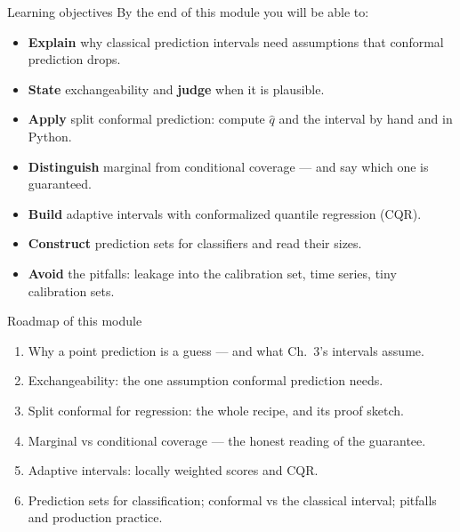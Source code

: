 \documentclass[aspectratio=169,11pt]{beamer}
\begin{document}
\begin{frame}{Learning objectives}
  By the end of this module you will be able to:
  \begin{itemize}
    \item \textbf{Explain} why classical prediction intervals need assumptions that
          conformal prediction drops.
    \item \textbf{State} exchangeability and \textbf{judge} when it is plausible.
    \item \textbf{Apply} split conformal prediction: compute $\hat q$ and the interval
          by hand and in Python.
    \item \textbf{Distinguish} marginal from conditional coverage --- and say which one
          is guaranteed.
    \item \textbf{Build} adaptive intervals with conformalized quantile regression (CQR).
    \item \textbf{Construct} prediction sets for classifiers and read their sizes.
    \item \textbf{Avoid} the pitfalls: leakage into the calibration set, time series,
          tiny calibration sets.
  \end{itemize}
\end{frame}

\begin{frame}{Roadmap of this module}
  \begin{takeaway}
    \begin{enumerate}
      \item Why a point prediction is a guess --- and what Ch.\ 3's intervals assume.
      \item Exchangeability: the one assumption conformal prediction needs.
      \item Split conformal for regression: the whole recipe, and its proof sketch.
      \item Marginal vs conditional coverage --- the honest reading of the guarantee.
      \item Adaptive intervals: locally weighted scores and CQR.
      \item Prediction sets for classification; conformal vs the classical interval;
            pitfalls and production practice.
    \end{enumerate}
  \end{takeaway}
\end{frame}
\end{document}
